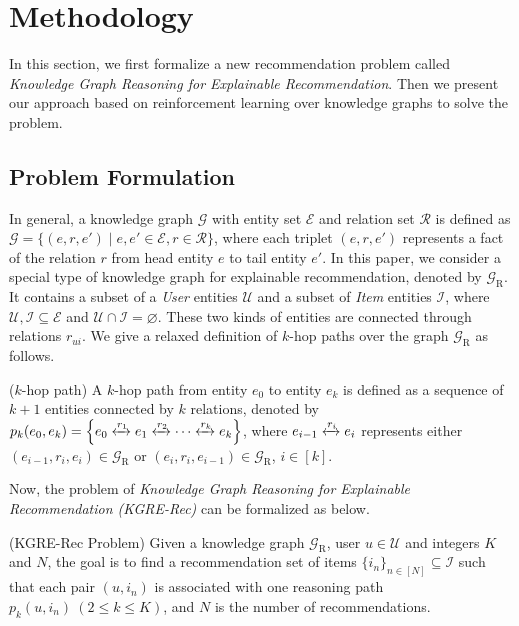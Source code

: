 \documentclass[sigconf]{acmart}
\begin{document}
\section{Methodology}\label{sec:method}
In this section, we first formalize a new recommendation problem called \emph{Knowledge Graph Reasoning for Explainable Recommendation}. 
Then we present our approach based on reinforcement learning over knowledge graphs to solve the problem.

\subsection{Problem Formulation}
In general, a knowledge graph $\mathcal{G}$ with entity set $\mathcal{E}$ and relation set $\mathcal{R}$ is defined as $\mathcal{G}=\{(e, r, e') \mid e,e'\in\mathcal{E}, r\in\mathcal{R}\}$, where each triplet $(e,r,e')$ represents a fact of the relation $r$ from head entity $e$ to tail entity $e'$.
In this paper, we consider a special type of knowledge graph for explainable recommendation, denoted by $\mathcal{G}_\text{R}$. 
It contains a subset of a \emph{User} entities $\mathcal{U}$ and a subset of \emph{Item} entities $\mathcal{I}$, where $\mathcal{U},\mathcal{I}\subseteq\mathcal{E}$ and $\mathcal{U}\cap\mathcal{I}=\varnothing$.
These two kinds of entities are connected through relations $r_{ui}$.
We give a relaxed definition of $k$-hop paths over the graph $\mathcal{G}_\text{R}$ as follows.

\begin{definition}{($k$-hop path)}
A $k$-hop path from entity $e_0$ to entity $e_k$ is defined as a sequence of $k+1$ entities connected by $k$ relations, denoted by $p_k(e_0,e_k)=\left\{e_0 \xleftrightarrow{r_1} e_1 \xleftrightarrow{r_2} \cdots \xleftrightarrow{r_k} e_k \right\}$, where $e_{i-1}\xleftrightarrow{r_i} e_{i}$ represents either $(e_{i-1},r_i,e_i)\in\mathcal{G}_\text{R}$ or $(e_{i},r_i,e_{i-1})\in\mathcal{G}_\text{R}$, $i\in [k]$.
\end{definition}

Now, the problem of \emph{Knowledge Graph Reasoning for Explainable Recommendation (KGRE-Rec)} can be formalized as below.

\begin{definition}{(KGRE-Rec Problem)}
Given a knowledge graph $\mathcal{G}_\text{R}$, user $u\in\mathcal{U}$ and integers $K$ and $N$, the goal is to find a recommendation set of items $\{i_n\}_{n\in[N]}\subseteq\mathcal{I}$ such that each pair $(u,i_n)$ is associated with one reasoning path $p_k(u,i_n)~(2\le k\le K)$, and $N$ is the number of recommendations.
\end{definition}
\end{document}
